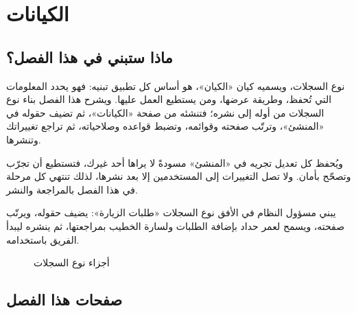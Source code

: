 \chapter{الكيانات}
\label{ch:builder-entities}

\section{ماذا ستبني في هذا الفصل؟}
\label{sec:builder-entities-intro}

نوع السجلات، ويسميه كيان «الكيان»، هو أساس كل تطبيق تبنيه: فهو يحدد المعلومات التي تُحفظ، وطريقة عرضها، ومن يستطيع العمل عليها. ويشرح هذا الفصل بناء نوع السجلات من أوله إلى نشره؛ فتنشئه من صفحة «الكيانات»، ثم تضيف حقوله في «المنشئ»، وترتّب صفحته وقوائمه، وتضبط قواعده وصلاحياته، ثم تراجع تغييراتك وتنشرها.

ويُحفظ كل تعديل تجريه في «المنشئ» مسودةً لا يراها أحد غيرك، فتستطيع أن تجرّب وتصحّح بأمان. ولا تصل التغييرات إلى المستخدمين إلا بعد نشرها، لذلك تنتهي كل مرحلة في هذا الفصل بالمراجعة والنشر.

\begin{rcnote}
يبني مسؤول النظام في الأفق نوع السجلات «طلبات الزيارة»: يضيف حقوله، ويرتّب صفحته، ويسمح لعمر حداد بإضافة الطلبات ولسارة الخطيب بمراجعتها، ثم ينشره ليبدأ الفريق باستخدامه.
\end{rcnote}

\begin{figure}[H]
\centering
{}
\rclegend
\caption{أجزاء نوع السجلات}
\label{fig:builder-models}
\end{figure}

\section{صفحات هذا الفصل}
\label{sec:builder-entities-pages}

